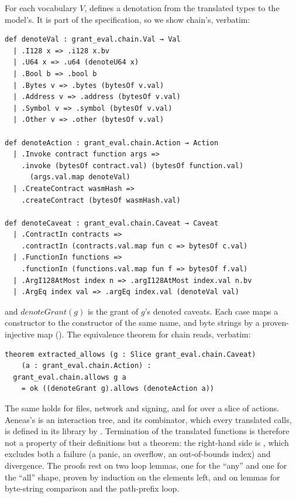 For each vocabulary $V$,  defines a denotation from the
translated types to the model's. It is part of the specification, so we show
chain's, verbatim:
\begin{lstlisting}[language=Lean]
def denoteVal : grant_eval.chain.Val → Val
  | .I128 x => .i128 x.bv
  | .U64 x => .u64 (denoteU64 x)
  | .Bool b => .bool b
  | .Bytes v => .bytes (bytesOf v.val)
  | .Address v => .address (bytesOf v.val)
  | .Symbol v => .symbol (bytesOf v.val)
  | .Other v => .other (bytesOf v.val)

def denoteAction : grant_eval.chain.Action → Action
  | .Invoke contract function args =>
    .invoke (bytesOf contract.val) (bytesOf function.val)
      (args.val.map denoteVal)
  | .CreateContract wasmHash =>
    .createContract (bytesOf wasmHash.val)

def denoteCaveat : grant_eval.chain.Caveat → Caveat
  | .ContractIn contracts =>
    .contractIn (contracts.val.map fun c => bytesOf c.val)
  | .FunctionIn functions =>
    .functionIn (functions.val.map fun f => bytesOf f.val)
  | .ArgI128AtMost index n => .argI128AtMost index.val n.bv
  | .ArgEq index val => .argEq index.val (denoteVal val)
\end{lstlisting}
and $\mathit{denoteGrant}(g)$ is the grant of $g$'s denoted caveats. Each case
maps a constructor to the constructor of the same name, and byte strings by a
proven-injective map (). The equivalence theorem for chain
reads, verbatim:
\begin{lstlisting}[language=Lean]
theorem extracted_allows (g : Slice grant_eval.chain.Caveat)
    (a : grant_eval.chain.Action) :
  grant_eval.chain.allows g a
    = ok ((denoteGrant g).allows (denoteAction a))
\end{lstlisting}
The same holds for files, network and signing, and for  over
a slice of actions.
Aeneas's  is an interaction tree, and its  combinator,
which every translated  calls, is defined in its library by
. Termination of the translated functions is therefore
not a property of their definitions but a theorem: the right-hand side is
, which excludes both a failure (a panic, an overflow, an
out-of-bounds index) and divergence. The proofs rest on two
loop lemmas, one for the ``any'' and one for the ``all'' shape, proven by
induction on the elements left, and on lemmas for byte-string comparison and
the path-prefix loop.

